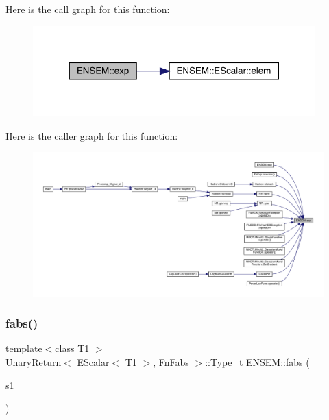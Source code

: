 Here is the call graph for this function\+:
\nopagebreak
\begin{figure}[H]
\begin{center}
\leavevmode
\includegraphics[width=309pt]{d4/dca/group__escalar_ga80b6028648c4f7d8f84f04d129bfa976_cgraph}
\end{center}
\end{figure}
Here is the caller graph for this function\+:
\nopagebreak
\begin{figure}[H]
\begin{center}
\leavevmode
\includegraphics[width=350pt]{d4/dca/group__escalar_ga80b6028648c4f7d8f84f04d129bfa976_icgraph}
\end{center}
\end{figure}
\mbox{\label{group__escalar_ga60eef052054b1a7da3e16a844de7d565}} 
\subsubsection{\texorpdfstring{fabs()}{fabs()}}
{\footnotesize\ttfamily template$<$class T1 $>$ \\
\mbox{\hyperlink{structENSEM_1_1UnaryReturn}{Unary\+Return}}$<$ \mbox{\hyperlink{classENSEM_1_1EScalar}{E\+Scalar}}$<$ T1 $>$, \mbox{\hyperlink{structENSEM_1_1FnFabs}{Fn\+Fabs}} $>$\+::Type\+\_\+t E\+N\+S\+E\+M\+::fabs (\begin{DoxyParamCaption}\item[{const \mbox{\hyperlink{classENSEM_1_1EScalar}{E\+Scalar}}$<$ T1 $>$ \&}]{s1 }\end{DoxyParamCaption})\hspace{0.3cm}{\ttfamily [inline]}}

